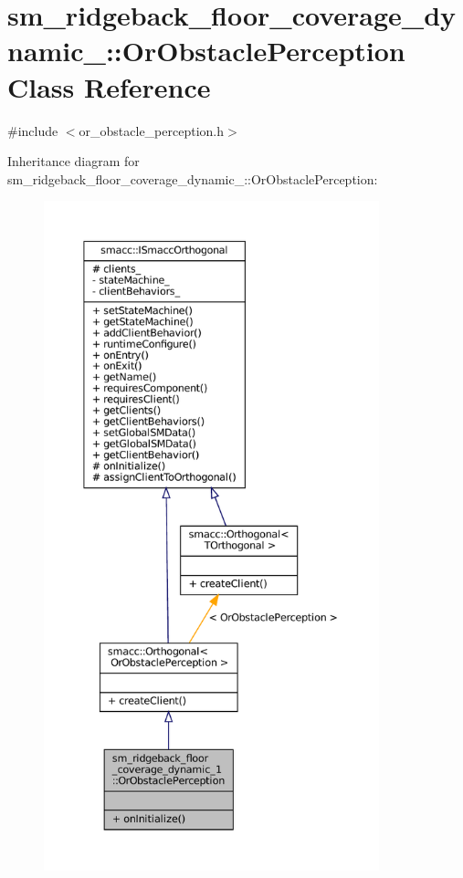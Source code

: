 \hypertarget{classsm__ridgeback__floor__coverage__dynamic__1_1_1OrObstaclePerception}{}\section{sm\+\_\+ridgeback\+\_\+floor\+\_\+coverage\+\_\+dynamic\+\_\+:\+:Or\+Obstacle\+Perception Class Reference}
\label{classsm__ridgeback__floor__coverage__dynamic__1_1_1OrObstaclePerception}


{\ttfamily \#include $<$or\+\_\+obstacle\+\_\+perception.\+h$>$}



Inheritance diagram for sm\+\_\+ridgeback\+\_\+floor\+\_\+coverage\+\_\+dynamic\+\_\+:\+:Or\+Obstacle\+Perception\+:
\nopagebreak
\begin{figure}[H]
\begin{center}
\leavevmode
\includegraphics[height=550pt]{classsm__ridgeback__floor__coverage__dynamic__1_1_1OrObstaclePerception__inherit__graph}
\end{center}
\end{figure}


